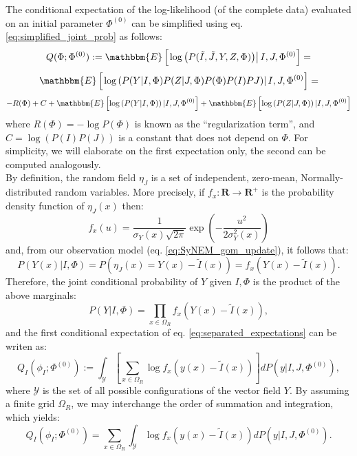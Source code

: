 The conditional expectation of the log-likelihood (of the complete data) evaluated on an initial parameter $\Phi^{(0)}$ can be simplified using eq. \eqref{eq:simplified_joint_prob} as follows:
\begin{displaymath}
    Q(\Phi; \Phi^{(0)}) := \mathbbm{E}\left[\left. \log \left(P(\tilde{I}, \tilde{J}, Y, Z, \Phi)\right) \right | I, J, \Phi^{(0)}\right] =
\end{displaymath}
\begin{displaymath}
    \mathbbm{E}\left[\left. \log \left(P(Y |I, \Phi)P(Z|J, \Phi)P(\Phi)P(I)P{J}\right) \right | I, J, \Phi^{(0)}\right] =
\end{displaymath}
\begin{equation}\label{eq:separated_expectations}
    -R(\Phi) + C + \mathbbm{E}\left[ \log \left(P(Y|I, \Phi)\right) | I, J, \Phi^{(0)}\right] + \mathbbm{E}\left[ \log \left(P(Z|J, \Phi)\right) | I, J, \Phi^{(0)}\right]
\end{equation}
where $R(\Phi) = -\log P(\Phi)$ is known as the ``regularization term'', and \hbox{$C=\log \left(P(I)P(J)\right)$} is a constant that does not depend on $\Phi$. For simplicity, we will elaborate on the first expectation only, the second can be computed analogously.\\

By definition, the random field $\eta_{J}$ is a set of independent, zero-mean, Normally-distributed random variables. More precisely, if $f_{x}:\mathbf{R}\rightarrow \mathbf{R}^{+}$ is the probability density
function of $\eta_{J}(x)$ then:
\begin{equation}\label{eq:gaussian}
    f_{x}(u) = \frac{1}{\sigma_{Y}(x)\sqrt{2 \pi}}\exp\left(-\frac{u^{2}}{2\sigma^{2}_{Y}(x)}\right)
\end{equation}
and, from our observation model (eq. \eqref{eq:SyNEM_gom_update}), it follows that:
\begin{equation}
    P(Y(x)| I, \Phi) = P(\eta_{J}(x) = Y(x)-\tilde{I}(x)) = f_{x}(Y(x)-\tilde{I}(x)).
\end{equation}
Therefore, the joint conditional probability of $Y$ given $I, \Phi$ is the product of the above marginals:
\begin{equation}\label{eq:Y_field_cond_indep}
    P(Y|I, \Phi) = \prod_{x\in{\Omega_{R}}} f_{x}(Y(x) - \tilde{I}(x)),
\end{equation}
and the first conditional expectation of eq. \eqref{eq:separated_expectations} can be writen as:
\begin{equation}
    Q_{I}(\phi_{I} ; \Phi^{(0)}) := \int_{\mathcal{Y}}\left[\sum_{x\in\Omega_{R}} \log f_{x}\left(y(x) - \tilde{I}(x)\right) \right] dP(y | I, J, \Phi^{(0)}),
\end{equation}
where $\mathcal{Y}$ is the set of all possible configurations of the vector field $Y$. By assuming a finite grid $\Omega_{R}$, we may interchange the order of summation and integration, which yields:
\begin{equation}\label{eq:data_term}
    Q_{I}(\phi_{I} ; \Phi^{(0)}) = \sum_{x\in\Omega_{R}} \int_{\mathcal{Y}} \log f_{x}\left(y(x) - \tilde{I}(x)\right)  dP(y | I, J, \Phi^{(0)}).
\end{equation}

